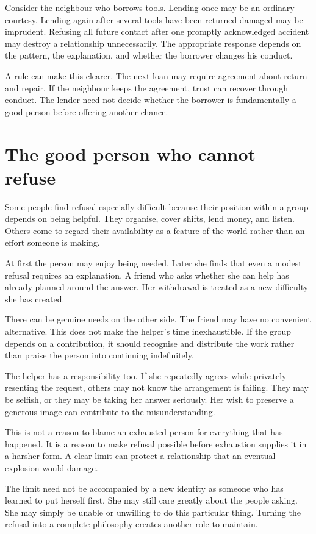 \documentclass[12pt,a4paper]{book}
\begin{document}
Consider the neighbour who borrows tools. Lending once may be an ordinary courtesy. Lending again after several tools have been returned damaged may be imprudent. Refusing all future contact after one promptly acknowledged accident may destroy a relationship unnecessarily. The appropriate response depends on the pattern, the explanation, and whether the borrower changes his conduct.

A rule can make this clearer. The next loan may require agreement about return and repair. If the neighbour keeps the agreement, trust can recover through conduct. The lender need not decide whether the borrower is fundamentally a good person before offering another chance.

\section*{The good person who cannot refuse}

Some people find refusal especially difficult because their position within a group depends on being helpful. They organise, cover shifts, lend money, and listen. Others come to regard their availability as a feature of the world rather than an effort someone is making.

At first the person may enjoy being needed. Later she finds that even a modest refusal requires an explanation. A friend who asks whether she can help has already planned around the answer. Her withdrawal is treated as a new difficulty she has created.

There can be genuine needs on the other side. The friend may have no convenient alternative. This does not make the helper's time inexhaustible. If the group depends on a contribution, it should recognise and distribute the work rather than praise the person into continuing indefinitely.

The helper has a responsibility too. If she repeatedly agrees while privately resenting the request, others may not know the arrangement is failing. They may be selfish, or they may be taking her answer seriously. Her wish to preserve a generous image can contribute to the misunderstanding.

This is not a reason to blame an exhausted person for everything that has happened. It is a reason to make refusal possible before exhaustion supplies it in a harsher form. A clear limit can protect a relationship that an eventual explosion would damage.

The limit need not be accompanied by a new identity as someone who has learned to put herself first. She may still care greatly about the people asking. She may simply be unable or unwilling to do this particular thing. Turning the refusal into a complete philosophy creates another role to maintain.
\end{document}
